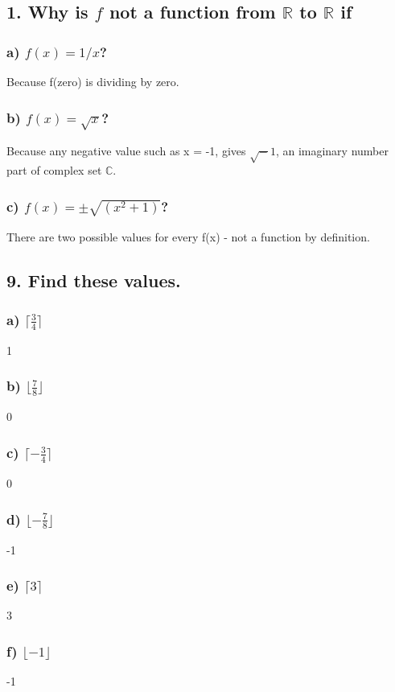 \documentclass[11pt, oneside]{article} %
\numberwithin{equation}{section} %
\numberwithin{figure}{section} %
\numberwithin{table}{section} %
\begin{document}
\subsection{1. Why is $f$ not a function from $\mathbb{R}$ to $\mathbb{R}$ if}
\subsubsection{a) $f(x)=1/x$?}
Because f(zero) is dividing by zero.
\subsubsection{b) $f(x)= \sqrt x$?}
Because any negative value such as x = -1, gives $\sqrt -1$, an imaginary number part of complex set $\mathbb{C}$.
\subsubsection{c) $f(x)=\pm \sqrt{(x^2+1)}$?}
There are two possible values for every f(x) - not a function by definition.

\subsection{9. Find these values.}
\subsubsection{a) $\lceil \frac{3}{4}\rceil$}
1
\subsubsection{b) $\lfloor \frac{7}{8}\rfloor $}
0
\subsubsection{c) $\lceil -\frac{3}{4}\rceil$}
0
\subsubsection{d) $\lfloor -\frac{7}{8}\rfloor$}
-1
\subsubsection{e) $\lceil 3\rceil$}
3
\subsubsection{f) $\lfloor -1\rfloor$}
-1
\end{document}
